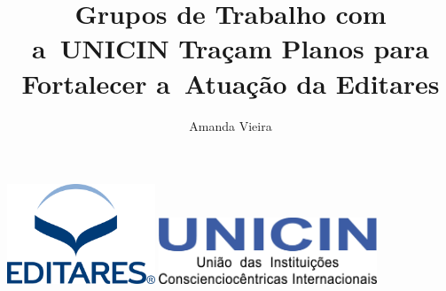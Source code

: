 \documentclass{gescons}
\author{Amanda Vieira}
\title{Grupos de Trabalho com a~UNICIN Traçam Planos para Fortalecer a~Atuação da Editares}
\begin{document}
    \makeentrevistatitle



\begin{center}
    \hspace{0.5cm}
    \includegraphics[height=3cm]{images/Logo-Editares-com-Marca-Registrada.png}
    \hspace{3cm}
    \includegraphics[height=2cm]{images/Unicin-Logo-1024x315.png} 
\end{center}
\end{document}

